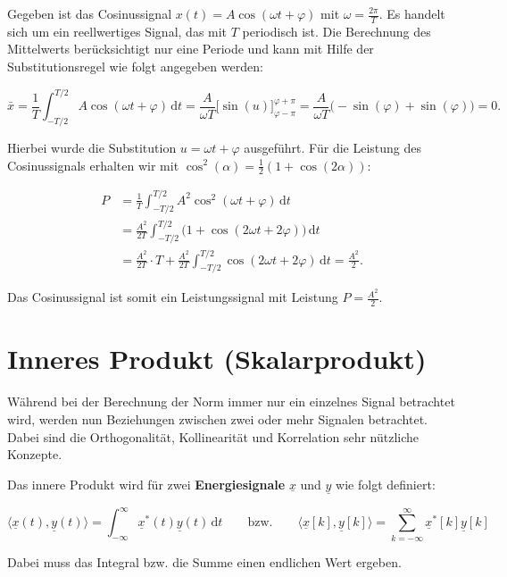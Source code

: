 \begin{beispiel}
Gegeben ist das Cosinussignal $x(t) = A\cos(\omega t + \varphi)$ mit $\omega = \frac{2\pi}{T}$. Es handelt sich um ein reellwertiges Signal, das mit $T$ periodisch ist. Die Berechnung des Mittelwerts berücksichtigt nur eine Periode und kann mit Hilfe der Substitutionsregel wie folgt angegeben werden:

$$
\bar{x} = \frac{1}{T}\int_{-T/2}^{T/2} A\cos(\omega t + \varphi)\,\mathrm{d}t
        = \frac{A}{\omega T}\bigl[\sin(u)\bigr]_{\varphi-\pi}^{\varphi+\pi}
        = \frac{A}{\omega T}\bigl(-\sin(\varphi) + \sin(\varphi)\bigr) = 0.
$$

Hierbei wurde die Substitution $u = \omega t + \varphi$ ausgeführt. Für die Leistung des Cosinussignals erhalten wir mit $\cos^2(\alpha) = \frac{1}{2}(1 + \cos(2\alpha))$:

$$
\begin{aligned}
P &= \frac{1}{T}\int_{-T/2}^{T/2} A^2\cos^2(\omega t + \varphi)\,\mathrm{d}t \\
  &= \frac{A^2}{2T}\int_{-T/2}^{T/2} \bigl(1 + \cos(2\omega t + 2\varphi)\bigr)\,\mathrm{d}t \\
  &= \frac{A^2}{2T}\cdot T + \frac{A^2}{2T}\int_{-T/2}^{T/2}\cos(2\omega t + 2\varphi)\,\mathrm{d}t = \frac{A^2}{2}.
\end{aligned}
$$

Das Cosinussignal ist somit ein Leistungssignal mit Leistung $P = \frac{A^2}{2}$.
\end{beispiel}

\chapter{Inneres Produkt (Skalarprodukt)}
\label{chap:inneres-produkt}

Während bei der Berechnung der Norm immer nur ein einzelnes Signal betrachtet wird, werden nun Beziehungen zwischen zwei oder mehr Signalen betrachtet. Dabei sind die Orthogonalität, Kollinearität und Korrelation sehr nützliche Konzepte.

\begin{definition}
Das innere Produkt wird für zwei \textbf{Energiesignale} $\underline{x}$ und $\underline{y}$ wie folgt definiert:

$$
\langle \underline{x}(t), \underline{y}(t) \rangle = \int_{-\infty}^{\infty} \underline{x}^*(t)\underline{y}(t)\,\mathrm{d}t
\qquad \text{bzw.} \qquad
\langle \underline{x}[k], \underline{y}[k] \rangle = \sum_{k=-\infty}^{\infty} \underline{x}^*[k]\underline{y}[k]
$$

Dabei muss das Integral bzw. die Summe einen endlichen Wert ergeben.
\end{definition}

